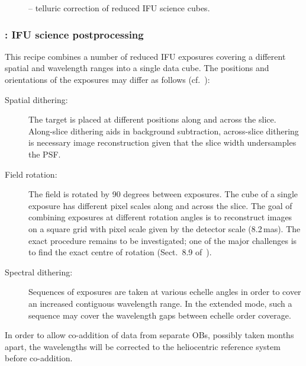 \begin{figure}[hb]
  \centering
    \def \globalscale {0.700000}
    \fontsize{10}{12}\selectfont
    
  \caption[Recipe: ]{
    -- telluric correction of reduced IFU science cubes.}
  \label{fig:metis_ifu_tellcorr}
\end{figure}


\clearpage
\subsubsection{: IFU science postprocessing}
\label{sssec:ifu_sci_postprocess}
\label{rec:metis_ifu_sci_postprocess}

This recipe combines a number of reduced IFU exposures covering a
different spatial and wavelength ranges into a single data cube. The
positions and orientations of the exposures may differ as follows (cf.~\cite{METIS-operational_concept}): %
\begin{description}
\item[Spatial dithering:] The target is placed at different positions
  along and across the slice. Along-slice dithering aids in background
  subtraction, across-slice dithering is necessary image
  reconstruction given that the slice width undersamples the PSF\@.
\item[Field rotation:] The field is rotated by 90 degrees between
  exposures. The cube of a single exposure has different pixel scales
  along and across the slice. The goal of combining exposures at
  different rotation angles is to reconstruct images on a square grid
  with pixel scale given by the detector scale (8.2\,mas). The exact
  procedure remains to be investigated; one of the major challenges is
  to find the exact centre of rotation
  (Sect.~8.9 of~\cite{DRLS}).
\item[Spectral dithering:] Sequences of exposures are taken at various
  echelle angles in order to cover an increased contiguous wavelength
  range. In the extended mode, such a sequence may cover the
  wavelength gaps between echelle order coverage.
\end{description}

In order to allow co-addition of data from separate OBs, possibly taken
months apart, the wavelengths will be corrected to the heliocentric
reference system before co-addition.

